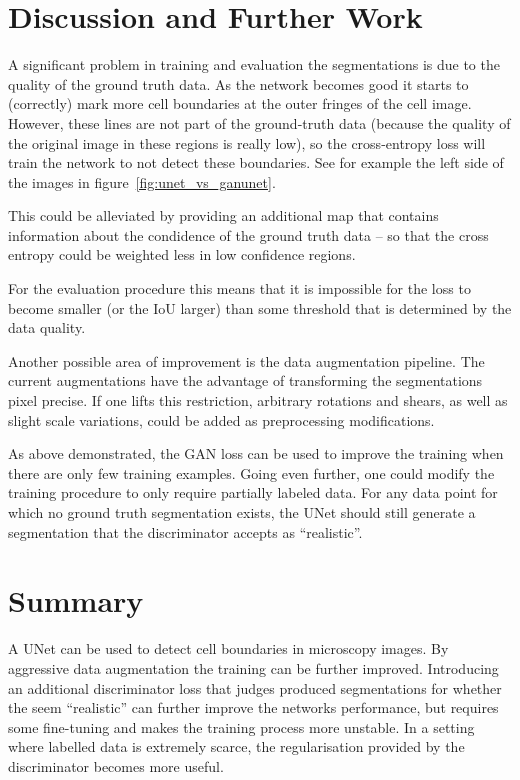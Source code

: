\documentclass[aps,prl,twocolumn,groupedaddress,amsmath,amssymb]{revtex4-1}
\begin{document}
    \section{Discussion and Further Work}
    A significant problem in training and evaluation the segmentations is due to the quality of the
    ground truth data. As the network becomes good it starts to (correctly) mark more cell 
    boundaries at the outer fringes of the cell image. However, these lines are not part of the 
    ground-truth data (because the quality of the original image in these regions is really low), so
    the cross-entropy loss will train the network to not detect these boundaries. See for example 
    the left side of the images in figure~\ref{fig:unet_vs_ganunet}.

    This could be alleviated by providing an additional map that contains information about the 
    condidence of the ground truth data -- so that the cross entropy could be weighted less in low
    confidence regions.

    For the evaluation procedure this means that it is impossible for the loss to become smaller 
    (or the IoU larger) than some threshold that is determined by the data quality.

    Another possible area of improvement is the data augmentation pipeline. The current 
    augmentations have the advantage of transforming the segmentations pixel precise. If one lifts 
    this restriction, arbitrary rotations and shears, as well as slight scale variations, could be
    added as preprocessing modifications.

    As above demonstrated, the GAN loss can be used to improve the training when there are only few
    training examples. Going even further, one could modify the training procedure to only require 
    partially labeled data. For any data point for which no ground truth segmentation exists, the 
    UNet should still generate a segmentation that the discriminator accepts as ``realistic''. 


    \section{Summary}

    A UNet can be used to detect cell boundaries in microscopy images. By aggressive data
    augmentation the training can be further improved. Introducing an additional discriminator loss
    that judges produced segmentations for whether the seem ``realistic'' can further improve the 
    networks performance, but requires some fine-tuning and makes the training process more 
    unstable. In a setting where labelled data is extremely scarce, the regularisation provided
    by the discriminator becomes more useful.




    
     
\end{document}

